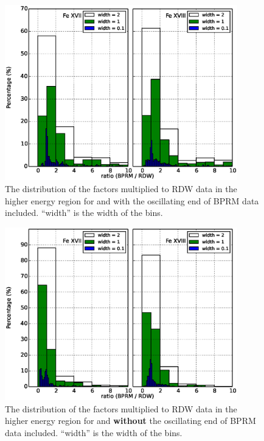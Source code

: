 \begin{figure}
	\centering
	\includegraphics[width=0.9\textwidth]{figures/ratio_bprm_fac.eps}
	\caption{The distribution of the factors multiplied to RDW data in the higher energy region for  and  with the oscillating end of BPRM data included. ``width'' is the width of the bins. }
	\label{fig_ratio}
\end{figure}

\begin{figure}
	\centering
	\includegraphics[width=0.9\textwidth]{figures/ratio_bprm_fac_no_oscillation.eps}
	\caption{The distribution of the factors multiplied to RDW data in the higher energy region for  and  \textbf{without} the oscillating end of BPRM data included. ``width'' is the width of the bins. }
	\label{fig_ratio_no_oscillation}
\end{figure}

